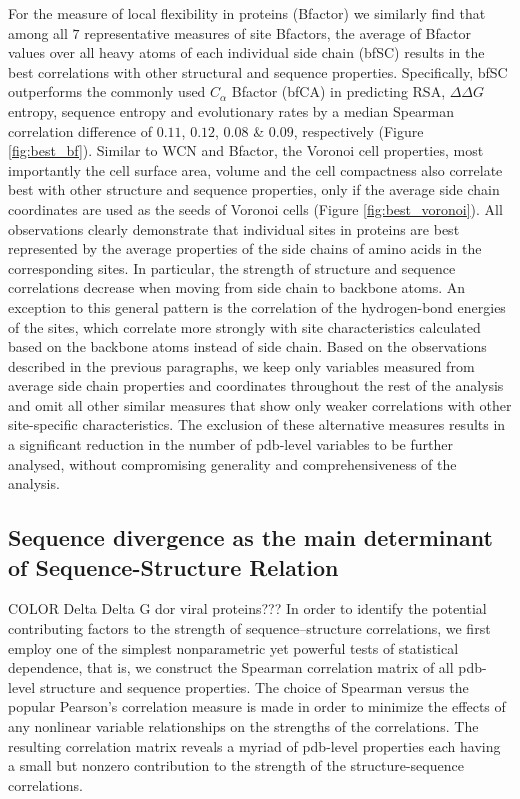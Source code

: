 \documentclass[12pt]{article}
\newcommand{\ddg}{$\Delta\Delta G~$}
\begin{document}
\indent For the measure of local flexibility in proteins (Bfactor) we similarly find that among all $7$ representative measures of site Bfactors, the average of Bfactor values over all heavy atoms of each individual side chain (bfSC) results in the best correlations with other structural and sequence properties. Specifically, bfSC outperforms the commonly used $C_\alpha$ Bfactor (bfCA) in predicting RSA, \ddg entropy, sequence entropy and evolutionary rates by a median Spearman correlation difference of $0.11$, $0.12$, $0.08$ \& $0.09$, respectively (Figure \ref{fig:best_bf}). Similar to WCN and Bfactor, the Voronoi cell properties, most importantly the cell surface area, volume and the cell compactness also correlate best with other structure and sequence properties, only if the average side chain coordinates are used as the seeds of Voronoi cells (Figure \ref{fig:best_voronoi}). All observations clearly demonstrate that individual sites in proteins are best represented by the average properties of the side chains of amino acids in the corresponding sites. In particular, the strength of structure and sequence correlations decrease when moving from side chain to backbone atoms. An exception to this general pattern is the correlation of the hydrogen-bond energies of the sites, which correlate more strongly with site characteristics calculated based on the backbone atoms instead of side chain. Based on the observations described in the previous paragraphs, we keep only variables measured from average side chain properties and coordinates throughout the rest of the analysis and omit all other similar measures that show only weaker correlations with other site-specific characteristics. The exclusion of these alternative measures results in a significant reduction in the number of pdb-level variables to be further analysed, without compromising generality and comprehensiveness of the analysis.\\

    \subsection*{Sequence divergence as the main determinant of Sequence-Structure Relation}
	{\color{red}COLOR Delta Delta G dor viral proteins???}
        In order to identify the potential contributing factors to the strength of sequence--structure correlations, we first employ one of the simplest nonparametric yet powerful tests of statistical dependence, that is, we construct the Spearman correlation matrix of all pdb-level structure and sequence properties. The choice of Spearman versus the popular Pearson's correlation measure is made in order to minimize the effects of any nonlinear variable relationships on the strengths of the correlations.  The resulting correlation matrix reveals a myriad of pdb-level properties each having a small but nonzero contribution to the strength of the structure-sequence correlations.
        \\
	
\end{document}
